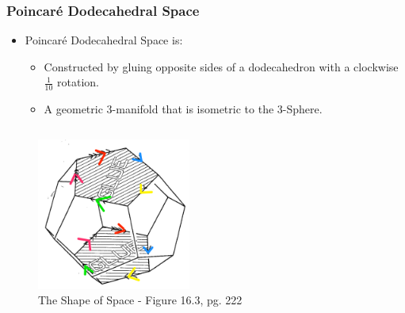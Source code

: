 \documentclass[13pt]{beamer}
\begin{document}

\begin{frame}
\frametitle{Poincar\'e Dodecahedral Space}
  \begin{itemize}
    \item \alert{Poincar\'e Dodecahedral Space} is:
          \begin{itemize}
             \item Constructed by gluing opposite sides of a dodecahedron with a clockwise $\frac{1}{10}$ rotation.
             \item A geometric 3-manifold that is isometric to the 3-Sphere.
           \end{itemize} 
  \end{itemize}

  \begin{columns}[c] %
     \centering
      \begin{figure}
        \includegraphics[height=5cm]{./img/one_tenth}
        \caption{The Shape of Space - Figure 16.3, pg. 222}
      \end{figure}
  \end{columns}
\end{frame}
\end{document}
